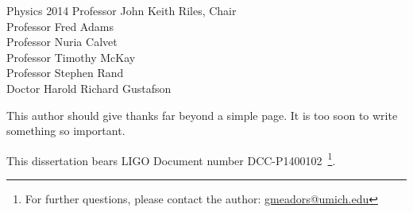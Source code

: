 \documentclass[leqno,twoside]{report}
\theoremstyle{plain}
\theoremstyle{definition}
\theoremstyle{remark}
\numberwithin{theorem}{chapter}        %
\begin{document}





{Physics} {2014}
{ Professor John Keith Riles, Chair \\
  Professor Fred Adams\\
  Professor Nuria Calvet\\
  Professor Timothy McKay\\
  Professor Stephen Rand\\
  Doctor Harold Richard Gustafson }



\initializefrontsections

{}

\setcounter{page}{1}


\startacknowledgementspage

This author should give thanks far beyond a simple page. It is too soon to write something so important.

This dissertation bears LIGO Document number DCC-P1400102~\footnote{For further questions, please contact the author: \href{mailto:gmeadors@umich.edu}{gmeadors@umich.edu}}.



\tableofcontents
\listoffigures
\listoftables

\startthechapters 
\end{document}
